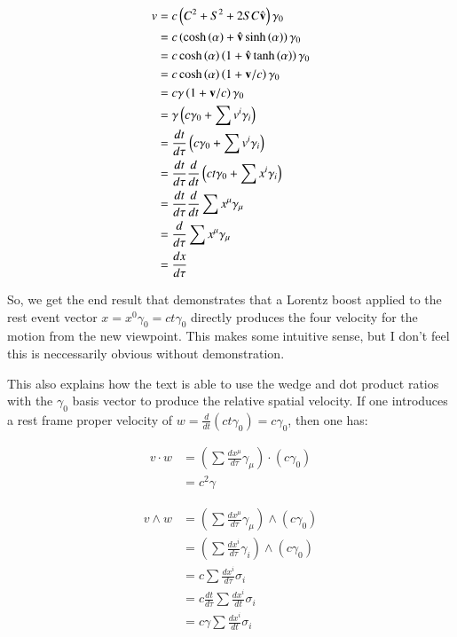 \documentclass{article}      %
\begin{document}
\begin{align*}
v
&= c \left( C^2 + S^2 + 2 SC \hat{\mathbf{v}} \right) \gamma_0 \\
&= c \left( \cosh\left(\alpha\right) + \hat{\mathbf{v}} \sinh\left(\alpha\right) \right) \gamma_0 \\
&= c \cosh\left(\alpha\right) \left( 1 + \hat{\mathbf{v}} \tanh\left(\alpha\right) \right) \gamma_0 \\
&= c \cosh\left(\alpha\right) \left( 1 + \mathbf{v}/c \right) \gamma_0 \\
&= c \gamma \left( 1 + \mathbf{v}/c \right) \gamma_0 \\
&= \gamma \left( c \gamma_0 + \sum v^i \gamma_i\right) \\
&= \frac{dt}{d\tau}\left( c \gamma_0 + \sum v^i \gamma_i\right) \\
&= \frac{dt}{d\tau} \frac{d}{dt}\left( c t \gamma_0 + \sum x^i \gamma_i\right) \\
&= \frac{dt}{d\tau} \frac{d}{dt} \sum x^{\mu} \gamma_{\mu} \\
&= \frac{d}{d\tau} \sum x^{\mu} \gamma_{\mu} \\
&= \frac{dx}{d\tau}
\end{align*}

So, we get the end result that demonstrates that a Lorentz boost applied to the rest event vector $x = x^0 \gamma_0 = c t \gamma_0$ directly produces the four velocity for the motion from the new viewpoint.  This makes some intuitive sense, but
I don't feel this is neccessarily obvious without demonstration.

This also explains how the text is able to use the wedge and dot product ratios with the $\gamma_0$ basis vector
to produce the relative spatial velocity.  If one introduces a rest frame proper velocity of
$w = \frac{d}{dt}\left(ct \gamma_0\right) = c \gamma_0$, then one has:

\begin{align*}
v \cdot w 
&= \left(\sum \frac{d x^{\mu}}{d\tau} \gamma_{\mu}\right) \cdot \left(c\gamma_0\right) \\
&= c^2 \gamma
\end{align*}

\begin{align*}
v \wedge w 
&= \left(\sum \frac{d x^{\mu}}{d\tau} \gamma_{\mu}\right) \wedge \left(c\gamma_0\right) \\
&= \left(\sum \frac{d x^{i}}{d\tau} \gamma_{i}\right) \wedge \left(c\gamma_0\right) \\
&= c \sum \frac{d x^{i}}{d\tau} \sigma_{i} \\
&= c \frac{dt}{d\tau} \sum \frac{d x^{i}}{dt} \sigma_{i} \\
&= c \gamma \sum \frac{d x^{i}}{dt} \sigma_{i} \\
\end{align*}
\end{document}
